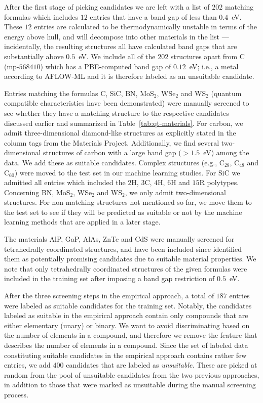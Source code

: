 \documentclass[superscriptaddress,unsortedaddress,
 amsmath,amssymb,
 aps,
]{revtex4-2}
\begin{document}
After the first stage of picking candidates we are left with a list of $202$ matching formulas which includes $12$ entries that have a band gap of less than $0.4$~eV. These $12$ entries are calculated to be thermodynamically unstable in terms of the energy above hull, and will decompose into other materials in the list --- incidentally, the resulting structures all have calculated band gaps that are substantially above $0.5$~eV. We include all of the $202$ structures apart from C (mp-$568410$) which has a PBE-computed band gap of $0.12$~eV; i.e., a metal according to AFLOW-ML and it is therefore labeled as an unsuitable candidate. 
 
Entries matching the formulas C, SiC, BN, MoS$_2$, WSe$_2$ and WS$_2$ (quantum compatible characteristics have been demonstrated) were manually screened to see whether they have a matching structure to the respective candidates discussed earlier and summarized in Table~\ref{tab:qt-materials}. 
For carbon, we admit three-dimensional diamond-like structures as explicitly stated in the column tags from the Materials Project. Additionally, we find several two-dimensional structures of carbon with a large band gap ($>1.5$~eV) among the data. We add these as suitable candidates. Complex structures (e.g., C$_{28}$, C$_{48}$ and C$_{60}$) were moved to the test set in our machine learning studies. For SiC we admitted all entries which included the $2$H, $3$C, $4$H, $6$H and $15$R polytypes. Concerning BN, MoS$_2$, WSe$_2$ and WS$_2$, we only admit two-dimensional structures. For non-matching structures not mentioned so far, we move them to the test set to see if they will be predicted as suitable or not by the machine learning methods that are applied in a later stage.

The materials AlP, GaP, AlAs, ZnTe and CdS were manually screened for tetrahedrally coordinated structures, and have been included since \citeauthor{Weber2010} \cite{Weber2010} identified them as potentially promising candidates due to suitable material properties. 
We note that only tetrahedrally coordinated structures of the given formulas were included in the training set after imposing a band gap restriction of $0.5$~eV. 

After the three screening steps in the empirical approach, a total of $187$ entries were labeled as suitable candidates for the training set. 
Notably, the candidates labeled as suitable in the empirical approach contain only compounds that are either elementary (unary) or binary. 
We want to avoid discriminating based on the number of elements in a compound, and therefore we remove the feature that describes the number of elements in a compound. 
Since the set of labeled data constituting suitable candidates in the empirical approach contains rather few entries, we add $400$ candidates that are labeled as \emph{unsuitable}. These are picked at random from the pool of unsuitable candidates from the two previous approaches, in addition to those that were marked as unsuitable during the manual screening process. 
\end{document}
